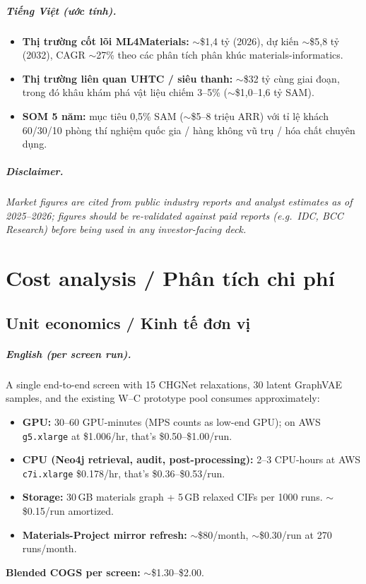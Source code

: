 \documentclass[11pt,a4paper]{report}
\begin{document}
\paragraph{Tiếng Việt (ước tính).}
\begin{itemize}[leftmargin=*,itemsep=2pt]
\item \textbf{Thị trường cốt lõi ML4Materials:} $\sim$\$1,4 tỷ (2026), dự kiến $\sim$\$5,8 tỷ
      (2032), CAGR $\sim$27\% theo các phân tích phân khúc materials-informatics.
\item \textbf{Thị trường liên quan UHTC / siêu thanh:} $\sim$\$32 tỷ cùng giai đoạn, trong
      đó khâu khám phá vật liệu chiếm 3--5\% ($\sim$\$1,0--1,6 tỷ SAM).
\item \textbf{SOM 5 năm:} mục tiêu 0,5\% SAM ($\sim$\$5--8 triệu ARR) với tỉ lệ khách
      60/30/10 phòng thí nghiệm quốc gia / hàng không vũ trụ / hóa chất chuyên dụng.
\end{itemize}

\paragraph{Disclaimer.}
\textit{Market figures are cited from public industry reports and analyst estimates as of
2025--2026; figures should be re-validated against paid reports (e.g.\ IDC, BCC Research)
before being used in any investor-facing deck.}

\chapter{Cost analysis / Phân tích chi phí}

\section{Unit economics / Kinh tế đơn vị}

\paragraph{English (per screen run).}
A single end-to-end screen with 15 CHGNet relaxations, 30 latent GraphVAE samples, and the
existing W--C prototype pool consumes approximately:
\begin{itemize}[leftmargin=*,itemsep=2pt]
\item \textbf{GPU:} 30--60 GPU-minutes (MPS counts as low-end GPU); on AWS \texttt{g5.xlarge}
      at \$1.006/hr, that's \$0.50--\$1.00/run.
\item \textbf{CPU (Neo4j retrieval, audit, post-processing):} 2--3 CPU-hours at AWS
      \texttt{c7i.xlarge} \$0.178/hr, that's \$0.36--\$0.53/run.
\item \textbf{Storage:} 30\,GB materials graph + 5\,GB relaxed CIFs per 1000 runs.
      $\sim$\$0.15/run amortized.
\item \textbf{Materials-Project mirror refresh:} $\sim$\$80/month, $\sim$\$0.30/run at 270
      runs/month.
\end{itemize}
\textbf{Blended COGS per screen:} $\sim$\$1.30--\$2.00.
\end{document}
